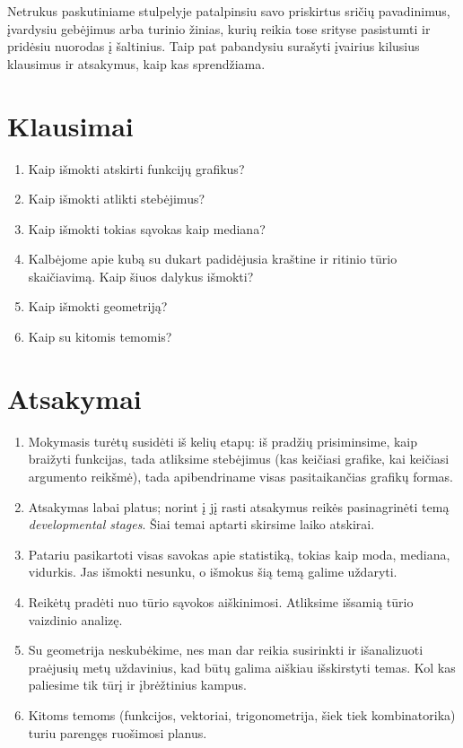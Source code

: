 \documentclass[a4paper]{article}
\begin{document}
Netrukus paskutiniame stulpelyje patalpinsiu savo priskirtus sričių pavadinimus, įvardysiu gebėjimus arba turinio žinias, kurių reikia tose srityse pasistumti ir pridėsiu nuorodas į šaltinius. Taip pat pabandysiu surašyti įvairius kilusius klausimus ir atsakymus, kaip kas sprendžiama.
\section*{Klausimai}
\begin{enumerate}
\item Kaip išmokti atskirti funkcijų grafikus?
\item Kaip išmokti atlikti stebėjimus?
\item Kaip išmokti tokias sąvokas kaip mediana?
\item Kalbėjome apie kubą su dukart padidėjusia kraštine ir ritinio tūrio skaičiavimą. Kaip šiuos dalykus išmokti?
\item Kaip išmokti geometriją?
\item Kaip su kitomis temomis?
\end{enumerate}
\section*{Atsakymai}
\begin{enumerate}
\item Mokymasis turėtų susidėti iš kelių etapų: iš pradžių prisiminsime, kaip braižyti funkcijas, tada atliksime stebėjimus (kas keičiasi grafike, kai keičiasi argumento reikšmė), tada apibendriname visas pasitaikančias grafikų formas. 
\item Atsakymas labai platus; norint į jį rasti atsakymus reikės pasinagrinėti temą \textit{developmental stages}. Šiai temai aptarti skirsime laiko atskirai. 
\item Patariu pasikartoti visas savokas apie statistiką, tokias kaip moda, mediana, vidurkis. Jas išmokti nesunku, o išmokus šią temą galime uždaryti.
\item Reikėtų pradėti nuo tūrio sąvokos aiškinimosi. Atliksime išsamią tūrio vaizdinio analizę.
\item Su geometrija neskubėkime, nes man dar reikia susirinkti ir išanalizuoti praėjusių metų uždavinius, kad būtų galima aiškiau išskirstyti temas. Kol kas paliesime tik tūrį ir įbrėžtinius kampus.
\item Kitoms temoms (funkcijos, vektoriai, trigonometrija, šiek tiek kombinatorika) turiu parengęs ruošimosi planus.
\end{enumerate}
\end{document}
